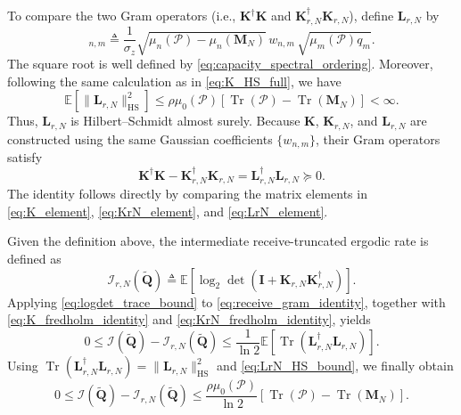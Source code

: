 \documentclass[lettersize,journal]{IEEEtran}
\theoremstyle{plain}
\begin{document}
To compare the two Gram operators (i.e., $\mathbf{K}^{\dagger}\mathbf{K}$ and $\mathbf{K}_{r, N}^{\dagger}\mathbf{K}_{r,N}$), define
$\mathbf{L}_{r,N}$ by
\begin{equation}
	[\mathbf L_{r,N}]_{n,m}
	\triangleq
	\frac{1}{\sigma_z}
	\sqrt{
		\mu_n(\mathcal P)-\mu_n(\mathbf M_N)
	}
	\,w_{n,m}\,
	\sqrt{\mu_m(\mathcal P)q_m}.
	\label{eq:LrN_element}
\end{equation}
The square root is well defined by
\eqref{eq:capacity_spectral_ordering}. Moreover, following the
same calculation as in \eqref{eq:K_HS_full}, we have
\begin{equation}
	\mathbb E
	\left[
	\|\mathbf L_{r,N}\|_{\mathrm{HS}}^2
	\right]
	\leq
	\rho\mu_0(\mathcal P)
	\left[
	\operatorname{Tr}(\mathcal P)
	-
	\operatorname{Tr}(\mathbf M_N)
	\right]
	<\infty.
	\label{eq:LrN_HS_bound}
\end{equation}
Thus, $\mathbf L_{r,N}$ is Hilbert--Schmidt almost surely.
Because $\mathbf K$, $\mathbf K_{r,N}$, and
$\mathbf L_{r,N}$ are constructed using the same Gaussian
coefficients $\{w_{n,m}\}$, their Gram operators satisfy
\begin{equation}
	\mathbf K^\dagger\mathbf K
	-
	\mathbf K_{r,N}^\dagger\mathbf K_{r,N}
	=
	\mathbf L_{r,N}^\dagger\mathbf L_{r,N}
	\succeq0.
	\label{eq:receive_gram_identity}
\end{equation}
The identity follows directly by comparing the matrix elements
in \eqref{eq:K_element}, \eqref{eq:KrN_element}, and
\eqref{eq:LrN_element}.

Given the definition above, the intermediate receive-truncated
ergodic rate is defined as
$$
	\mathcal I_{r,N}
	\left(
	\widetilde{\mathbf Q}
	\right)
	\triangleq
	\mathbb E
	\left[
	\log_2
	\det
	\left(
	\mathbf I+
	\mathbf K_{r,N}
	\mathbf K_{r,N}^\dagger
	\right)
	\right].
	\label{eq:IrN_definition}
$$
Applying \eqref{eq:logdet_trace_bound} to
\eqref{eq:receive_gram_identity}, together with
\eqref{eq:K_fredholm_identity} and
\eqref{eq:KrN_fredholm_identity}, yields
$$
	0
	\leq
	\mathcal I
	\left(
	\widetilde{\mathbf Q}
	\right)
	-
	\mathcal I_{r,N}
	\left(
	\widetilde{\mathbf Q}
	\right) \leq
	\frac{1}{\ln2}
	\mathbb E
	\left[
	\operatorname{Tr}
	\left(
	\mathbf L_{r,N}^\dagger
	\mathbf L_{r,N}
	\right)
	\right].
	\label{eq:receive_rate_gap_1}
$$
Using
$\operatorname{Tr}
(\mathbf L_{r,N}^\dagger\mathbf L_{r,N})
=
\|\mathbf L_{r,N}\|_{\mathrm{HS}}^2$
and \eqref{eq:LrN_HS_bound}, we finally obtain
\begin{equation}
	0
	\leq
	\mathcal I
	\left(
	\widetilde{\mathbf Q}
	\right)
	-
	\mathcal I_{r,N}
	\left(
	\widetilde{\mathbf Q}
	\right)
	\leq
	\frac{\rho\mu_0(\mathcal P)}{\ln2}
	\left[
	\operatorname{Tr}(\mathcal P)
	-
	\operatorname{Tr}(\mathbf M_N)
	\right].
	\label{eq:receive_rate_gap}
\end{equation}
\end{document}
